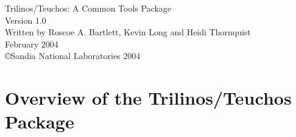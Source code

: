 \documentclass[letterpaper]{book}
\begin{document}
\begin{titlepage}
\begin{center}
{\Huge Trilinos/Teuchos:  A Common Tools Package\\[1ex]\large Version 1.0}\\
\vspace*{1cm}
{\large Written by Roscoe A. Bartlett, Kevin Long and Heidi Thornquist}\\
\vspace*{0.5cm}
{\small February 2004}\\
\copyright Sandia National Laboratories 2004
\end{center}
\end{titlepage}
\clearemptydoublepage
{}
\tableofcontents
\clearemptydoublepage
{}
\chapter{Overview of the Trilinos/Teuchos Package}

\end{document}
